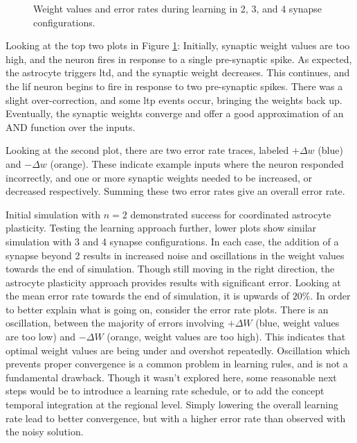\documentclass[conference]{IEEEtran}
\newcommand{\asvgf}[4]{
	\begin{figure}[!htbp]
    	\centering
		\adjustbox{max width=#4\linewidth}{}
        \caption{#2.}
        \label{#3}
	\end{figure}
}
\begin{document}

\asvgf{figures/artifacts/obj3/astro_and_lif.svg}{Weight values and error rates
  during learning in 2, 3, and 4 synapse
  configurations}{fig:snn_astro_and}{1.0}

Looking at the top two plots in Figure \ref{fig:snn_astro_and}: Initially,
synaptic weight values are too high, and the neuron fires in response to a
single pre-synaptic spike. As expected, the astrocyte triggers \gls{ltd}, and
the synaptic weight decreases. This continues, and the \gls{lif} neuron begins
to fire in response to two pre-synaptic spikes. There was a slight
over-correction, and some \gls{ltp} events occur, bringing the weights back
up. Eventually, the synaptic weights converge and offer a good approximation of
an AND function over the inputs.

Looking at the second plot, there are two error rate traces, labeled
$+\Delta w$ (blue) and $-\Delta w$ (orange). These indicate example inputs where the neuron
responded incorrectly, and one or more synaptic weights needed to be increased,
or decreased respectively. Summing these two error rates give an overall error
rate.

Initial simulation with $n=2$ demonstrated success for coordinated astrocyte
plasticity. Testing the learning approach further, lower plots show similar
simulation with 3 and 4 synapse configurations. In each case, the addition of a
synapse beyond 2 results in increased noise and oscillations in the weight
values towards the end of simulation. Though still moving in the right
direction, the astrocyte plasticity approach provides results with significant
error. Looking at the mean error rate towards the end of simulation, it is
upwards of $20\%$. In order to better explain what is going on, consider the
error rate plots. There is an oscillation, between the majority of errors
involving $+\Delta W$ (blue, weight values are too low) and $-\Delta W$ (orange,
weight values are too high). This indicates that optimal weight values are being
under and overshot repeatedly. Oscillation which prevents proper convergence is
a common problem in learning rules, and is not a fundamental drawback. Though it
wasn't explored here, some reasonable next steps would be to introduce a
learning rate schedule, or to add the concept temporal integration at the
regional level. Simply lowering the overall learning rate lead to better
convergence, but with a higher error rate than observed with the noisy solution.
\end{document}
